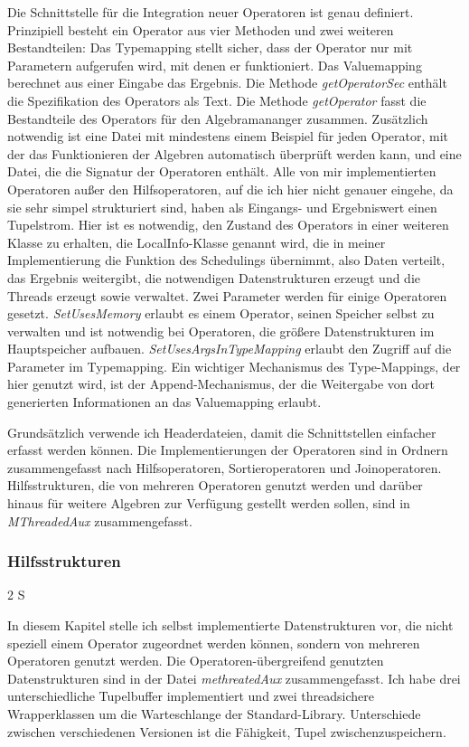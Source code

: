 \documentclass[a4paper,12pt,twoside]{article}
\newcommand{\Fb}[1]{\textit{#1}} %
\begin{document}
{Die Schnittstelle für die Integration neuer Operatoren ist genau definiert. Prinzipiell besteht ein Operator aus vier Methoden und zwei weiteren Bestandteilen: Das Typemapping stellt sicher, dass der Operator nur mit Parametern aufgerufen wird, mit denen er funktioniert. Das Valuemapping berechnet aus einer Eingabe das Ergebnis. Die Methode \Fb{getOperatorSec} enthält die Spezifikation des Operators als Text. Die Methode \Fb{getOperator} fasst die Bestandteile des Operators für den Algebramananger zusammen. Zusätzlich notwendig ist eine Datei mit mindestens einem Beispiel für jeden Operator, mit der das Funktionieren der Algebren automatisch überprüft werden kann, und eine Datei, die die Signatur der Operatoren enthält. Alle von mir implementierten Operatoren außer den Hilfsoperatoren, auf die ich hier nicht genauer eingehe, da sie sehr simpel strukturiert sind, haben als Eingangs- und Ergebniswert einen Tupelstrom. Hier ist es notwendig, den Zustand des Operators in einer weiteren Klasse zu erhalten, die LocalInfo-Klasse genannt wird, die in meiner Implementierung die Funktion des Schedulings übernimmt, also Daten verteilt, das Ergebnis weitergibt, die notwendigen Datenstrukturen erzeugt und die Threads erzeugt sowie verwaltet. Zwei Parameter werden für einige Operatoren gesetzt. \Fb{SetUsesMemory} erlaubt es einem Operator, seinen Speicher selbst zu verwalten und ist notwendig bei Operatoren, die größere Datenstrukturen im Hauptspeicher aufbauen. \Fb{SetUsesArgsInTypeMapping} erlaubt den Zugriff auf die Parameter im Typemapping. Ein wichtiger Mechanismus des Type-Mappings, der hier genutzt wird, ist der Append-Mechanismus, der die Weitergabe von dort generierten Informationen an das Valuemapping erlaubt.

Grundsätzlich verwende ich Headerdateien, damit die Schnittstellen einfacher erfasst werden können. Die Implementierungen der Operatoren sind in Ordnern zusammengefasst nach Hilfsoperatoren, Sortieroperatoren und Joinoperatoren. Hilfsstrukturen, die von mehreren Operatoren genutzt werden und darüber hinaus für weitere Algebren zur Verfügung gestellt werden sollen, sind in \Fb{MThreadedAux} zusammengefasst.

\subsubsection{Hilfsstrukturen} 2 S
\label{Hilfsstrukturen} 

In diesem Kapitel stelle ich  selbst implementierte Datenstrukturen vor, die nicht speziell einem Operator zugeordnet werden können, sondern von mehreren Operatoren genutzt werden. Die Operatoren-übergreifend genutzten Datenstrukturen sind in der Datei \Fb{methreatedAux} zusammengefasst. Ich habe drei unterschiedliche Tupelbuffer implementiert und zwei threadsichere Wrapperklassen um die Warteschlange der Standard-Library. Unterschiede zwischen verschiedenen Versionen ist die Fähigkeit, Tupel zwischenzuspeichern.

}
\end{document}
